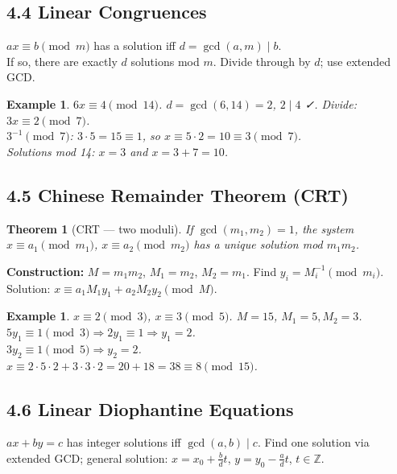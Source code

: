 \documentclass[11pt]{article}
\newtheorem{example}[definition]{Example}
\newtheorem{theorem}[definition]{Theorem}
\newcommand{\Z}{\mathbb{Z}}
\newcommand{\divides}{\mid}
\begin{document}
\subsection*{4.4 Linear Congruences}

$ax\equiv b\pmod m$ has a solution iff $d=\gcd(a,m)\divides b$.\\
If so, there are exactly $d$ solutions mod $m$. Divide through by $d$; use extended GCD.

\begin{example}
$6x\equiv 4\pmod{14}$. $d=\gcd(6,14)=2$, $2\divides 4$ ✓. Divide: $3x\equiv 2\pmod 7$.\\
$3^{-1}\pmod 7$: $3\cdot5=15\equiv1$, so $x\equiv 5\cdot2=10\equiv 3\pmod 7$.\\
Solutions mod 14: $x=3$ and $x=3+7=10$.
\end{example}

\subsection*{4.5 Chinese Remainder Theorem (CRT)}

\begin{theorem}[CRT — two moduli]
If $\gcd(m_1,m_2)=1$, the system
$x\equiv a_1\pmod{m_1}$,\; $x\equiv a_2\pmod{m_2}$
has a unique solution mod $m_1 m_2$.
\end{theorem}

\textbf{Construction:} $M=m_1 m_2$, $M_1=m_2$, $M_2=m_1$. Find $y_i=M_i^{-1}\pmod{m_i}$.\\
Solution: $x\equiv a_1 M_1 y_1 + a_2 M_2 y_2\pmod{M}$.

\begin{example}
$x\equiv2\pmod3$, $x\equiv3\pmod5$. $M=15$, $M_1=5,M_2=3$.\\
$5y_1\equiv1\pmod3\Rightarrow 2y_1\equiv1\Rightarrow y_1=2$.\\
$3y_2\equiv1\pmod5\Rightarrow y_2=2$.\\
$x\equiv2\cdot5\cdot2+3\cdot3\cdot2=20+18=38\equiv8\pmod{15}$.
\end{example}

\subsection*{4.6 Linear Diophantine Equations}

$ax+by=c$ has integer solutions iff $\gcd(a,b)\divides c$. Find one solution via extended GCD; general solution: $x=x_0+\frac{b}{d}t$, $y=y_0-\frac{a}{d}t$, $t\in\Z$.
\end{document}
